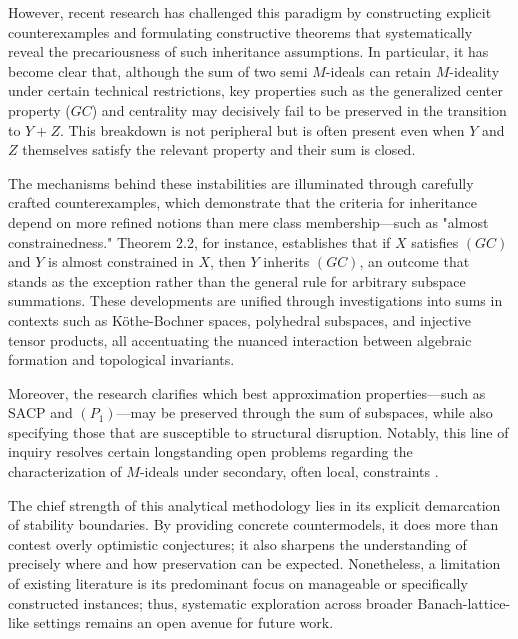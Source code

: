 However, recent research has challenged this paradigm by constructing explicit counterexamples and formulating constructive theorems that systematically reveal the precariousness of such inheritance assumptions. In particular, it has become clear that, although the sum of two semi $M$-ideals can retain $M$-ideality under certain technical restrictions, key properties such as the generalized center property ($GC$) and centrality may decisively fail to be preserved in the transition to $Y + Z$. This breakdown is not peripheral but is often present even when $Y$ and $Z$ themselves satisfy the relevant property and their sum is closed.

The mechanisms behind these instabilities are illuminated through carefully crafted counterexamples, which demonstrate that the criteria for inheritance depend on more refined notions than mere class membership—such as "almost constrainedness." Theorem 2.2, for instance, establishes that if $X$ satisfies $(GC)$ and $Y$ is almost constrained in $X$, then $Y$ inherits $(GC)$, an outcome that stands as the exception rather than the general rule for arbitrary subspace summations. These developments are unified through investigations into sums in contexts such as Köthe-Bochner spaces, polyhedral subspaces, and injective tensor products, all accentuating the nuanced interaction between algebraic formation and topological invariants.

Moreover, the research clarifies which best approximation properties—such as SACP and $(P_1)$—may be preserved through the sum of subspaces, while also specifying those that are susceptible to structural disruption. Notably, this line of inquiry resolves certain longstanding open problems regarding the characterization of $M$-ideals under secondary, often local, constraints \cite{ref103}.

The chief strength of this analytical methodology lies in its explicit demarcation of stability boundaries. By providing concrete countermodels, it does more than contest overly optimistic conjectures; it also sharpens the understanding of precisely where and how preservation can be expected. Nonetheless, a limitation of existing literature is its predominant focus on manageable or specifically constructed instances; thus, systematic exploration across broader Banach-lattice-like settings remains an open avenue for future work.

